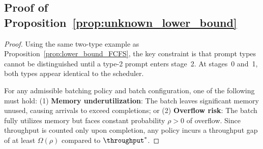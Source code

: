 \subsection{Proof of Proposition~\ref{prop:unknown_lower_bound}}
\label{appendix:proof_unknown_lower_bound}

\begin{proof}
Using the same two-type example as Proposition~\ref{prop:lower_bound_FCFS}, the key constraint is that prompt types cannot be distinguished until a type-2 prompt enters stage~2. At stages~0 and~1, both types appear identical to the scheduler.

For any admissible batching policy and batch configuration, one of the following must hold: (1) \textbf{Memory underutilization}: The batch leaves significant memory unused, causing arrivals to exceed completions; or (2) \textbf{Overflow risk}: The batch fully utilizes memory but faces constant probability $\rho > 0$ of overflow. Since throughput is counted only upon completion, any policy incurs a throughput gap of at least $\Omega(\rho)$ compared to $\throughput^*$.
\end{proof}









